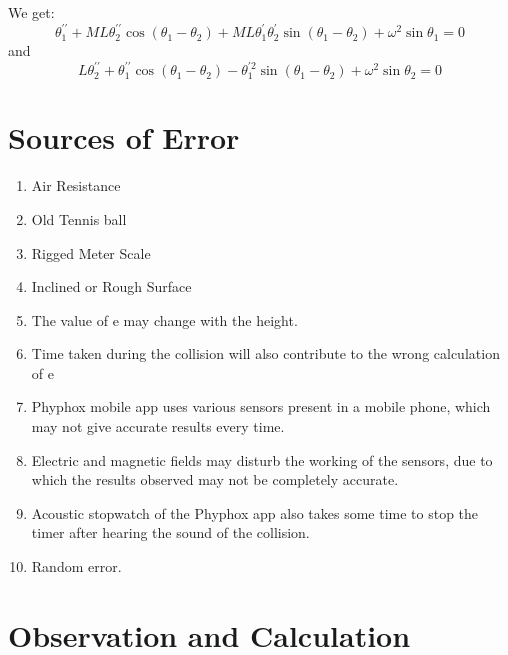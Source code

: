 \documentclass[11pt]{scrartcl} %
\begin{document}
We get:
\begin{equation}
\theta_{1}^{\prime \prime}+M L \theta_{2}^{\prime \prime} \cos \left(\theta_{1}-\theta_{2}\right)+M L \theta_{1}^{\prime} \theta_{2}^{\prime} \sin \left(\theta_{1}-\theta_{2}\right)+\omega^{2} \sin \theta_{1}=0
\end{equation}
and
\begin{equation}
L \theta_{2}^{\prime \prime}+\theta_{1}^{\prime \prime} \cos \left(\theta_{1}-\theta_{2}\right)-\theta_{1}^{\prime 2} \sin \left(\theta_{1}-\theta_{2}\right)+\omega^{2} \sin \theta_{2}=0
\end{equation}




\section{Sources of Error}
\begin{enumerate}
	\item Air Resistance
	\item Old Tennis ball
	\item Rigged Meter Scale
	\item Inclined or Rough Surface
	\item The value of e may change with the height.
	\item Time taken during the collision will also contribute to the wrong calculation of e
	\item Phyphox mobile app uses various sensors present in a mobile phone, which may not give accurate results every time.
	\item Electric and magnetic fields may disturb the working of the sensors, due to which the results observed may not be completely accurate.
	\item Acoustic stopwatch of the Phyphox app also takes some time to stop the timer after hearing the sound of the collision.
	\item Random error.
\end{enumerate}
\newpage

\section{Observation and Calculation}
\end{document}
